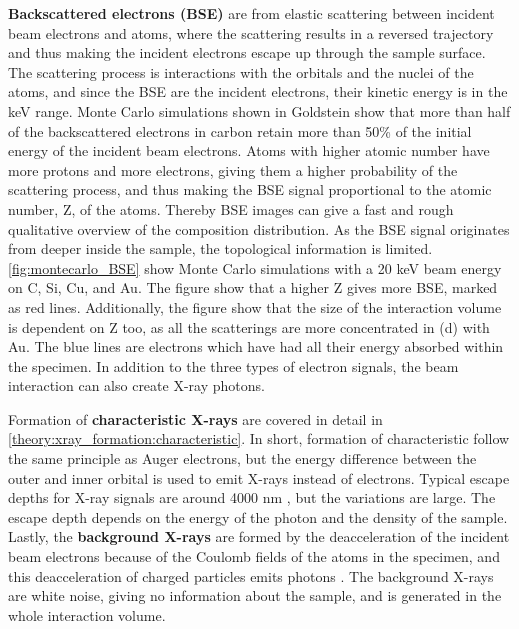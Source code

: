 \textbf{Backscattered electrons (BSE)} are from elastic scattering between incident beam electrons and atoms, where the scattering results in a reversed trajectory and thus making the incident electrons escape up through the sample surface.
The scattering process is interactions with the orbitals and the nuclei of the atoms, and since the BSE are the incident electrons, their kinetic energy is in the keV range.
Monte Carlo simulations shown in Goldstein \cite[Fig. 2.16 b]{goldstein_scanning_2018} show that more than half of the backscattered electrons in carbon retain more than 50\% of the initial energy of the incident beam electrons.
Atoms with higher atomic number have more protons and more electrons, giving them a higher probability of the scattering process, and thus making the BSE signal proportional to the atomic number, Z, of the atoms.
Thereby BSE images can give a fast and rough qualitative overview of the composition distribution.
As the BSE signal originates from deeper inside the sample, the topological information is limited.
\cref{fig:montecarlo_BSE} show Monte Carlo simulations with a 20 keV beam energy on C, Si, Cu, and Au.
The figure show that a higher Z gives more BSE, marked as red lines.
Additionally, the figure show that the size of the interaction volume is dependent on Z too, as all the scatterings are more concentrated in (d) with Au.
The blue lines are electrons which have had all their energy absorbed within the specimen.
In addition to the three types of electron signals, the beam interaction can also create X-ray photons.




Formation of \textbf{characteristic X-rays} are covered in detail in \cref{theory:xray_formation:characteristic}.
In short, formation of characteristic follow the same principle as Auger electrons, but the energy difference between the outer and inner orbital is used to emit X-rays instead of electrons.
Typical escape depths for X-ray signals are around 4000 nm \cite{hollas_modern_2004}, but the variations are large.
The escape depth depends on the energy of the photon and the density of the sample.
Lastly, the \textbf{background X-rays} are formed by the deacceleration of the incident beam electrons because of the Coulomb fields of the atoms in the specimen, and this deacceleration of charged particles emits photons \cite{notaros_electromagnetics_2010}.
The background X-rays are white noise, giving no information about the sample, and is generated in the whole interaction volume.




